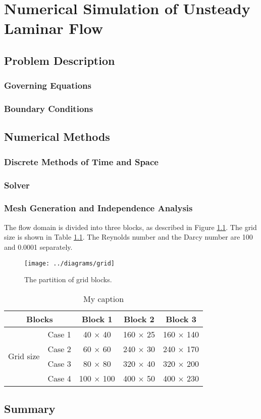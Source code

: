 \chapter{Numerical Simulation of Unsteady Laminar Flow}
\section{Problem Description}
\subsection{Governing Equations} %
\subsection{Boundary Conditions} %


\section{Numerical Methods}
\subsection{Discrete Methods of Time and Space}
\subsection{Solver} %
\subsection{Mesh Generation and Independence Analysis}
The flow domain is divided into three blocks, as described in Figure \ref{fig: grid}. The grid size is shown in Table \ref{tab: grid}. The Reynolds number and the Darcy number are 100 and 0.0001 separately.

\begin{figure}
	\centering
	\texttt{[image: ../diagrams/grid]}
	\caption{The partition of grid blocks.}\label{fig: grid}
\end{figure}
\begin{table}[h]
	\centering
	\caption{My caption}
	\label{tab: grid}
	\begin{tabular}{@{}ccccc@{}}
		\toprule
		\multicolumn{2}{c}{Blocks}  & Block 1  & Block 2   & Block 3    \\ \midrule
		\multirow{4}{*}{Grid size} 
		& Case 1 & 40 $\times$ 40 & 160 $\times$ 25 & 160 $\times$ 140 \\
		& Case 2 & 60 $\times$ 60 & 240 $\times$ 30 & 240 $\times$ 170 \\
		& Case 3 & 80 $\times$ 80 & 320 $\times$ 40 & 320 $\times$ 200 \\
		& Case 4 & 100 $\times$ 100 & 400 $\times$ 50 & 400 $\times$ 230 \\
		\bottomrule
	\end{tabular}
\end{table}


\section{Summary}
